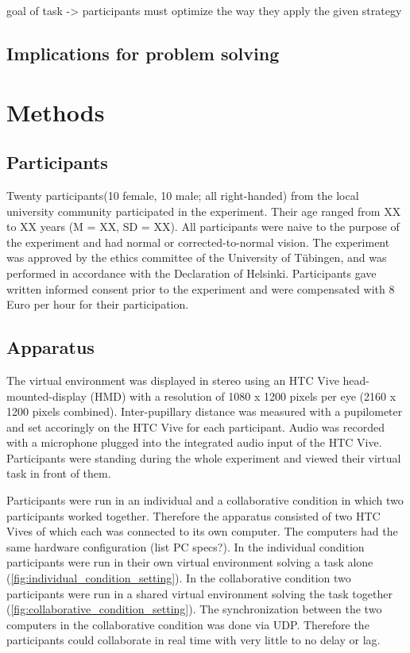 \documentclass{article}
\begin{document}
goal of task -> participants must optimize the way they apply the given strategy
\subsection{Implications for problem solving}

\section{Methods}

\subsection{Participants}
Twenty participants(10 female, 10 male; all right-handed) from the local university community participated in the experiment. Their age ranged from XX to XX years (M = XX, SD = XX). All participants were naive to the purpose of the experiment and had normal or corrected-to-normal vision. The experiment was approved by the ethics committee of the University of T\"ubingen, and was performed in accordance with the Declaration of Helsinki. Participants gave written informed consent prior to the experiment and were compensated with 8 Euro per hour for their participation. 

\subsection{Apparatus}
The virtual environment was displayed in stereo using an HTC Vive head-mounted-display (HMD) with a resolution of 1080 x 1200 pixels per eye (2160 x 1200 pixels combined). Inter-pupillary distance was measured with a pupilometer and set accoringly on the HTC Vive for each participant. Audio was recorded with a microphone plugged into the integrated audio input of the HTC Vive. Participants were standing during the whole experiment and viewed their virtual task in front of them.

Participants were run in an individual and a collaborative condition in which two participants worked together. Therefore the apparatus consisted of two HTC Vives of which each was connected to its own computer. The computers had the same hardware configuration (list PC specs?). In the individual condition participants were run in their own virtual environment solving a task alone (\ref{fig:individual_condition_setting}). In the collaborative condition two participants were run in a shared virtual environment solving the task together (\ref{fig:collaborative_condition_setting}). The synchronization between the two computers in the collaborative condition was done via UDP. Therefore the participants could collaborate in real time with very little to no delay or lag.
\end{document}
